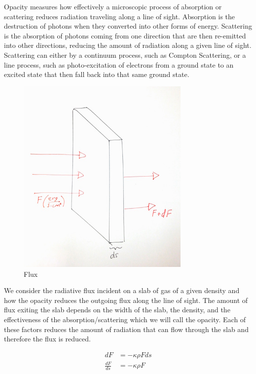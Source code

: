 \documentclass{article}
\begin{document}
Opacity measures how effectively a microscopic process of absorption or scattering reduces radiation traveling along a line of sight. Absorption is the destruction of photons when they converted into other forms of energy. Scattering is the absorption of photons coming from one direction that are then re-emitted into other directions, reducing the amount of radiation along a given line of sight. Scattering can either by a continuum process, such as Compton Scattering, or a line process, such as photo-excitation of electrons from a ground state to an excited state that then fall back into that same ground state.

\begin{figure}
    \centering
    \includegraphics[width=0.75\textwidth]{Flux1.jpg}
    \caption{Flux}
    \label{fig:flux}
\end{figure}

We consider the radiative flux incident on a slab of gas of a given density and how the opacity reduces the outgoing flux along the line of sight. The amount of flux exiting the slab depends on the width of the slab, the density, and the effectiveness of the absorption/scattering which we will call the opacity. Each of these factors reduces the amount of radiation that can flow through the slab and therefore the flux is reduced. 

$$
\begin{aligned}
dF &= -\kappa \rho F ds \\
\frac{dF}{ds} &= - \kappa \rho F
\end{aligned}
$$
\end{document}
